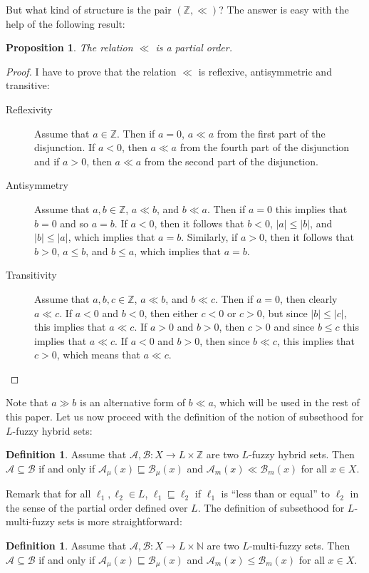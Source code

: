 \documentclass{amsart}
\newtheorem{proposition}[theorem]{Proposition}
\theoremstyle{definition}
\newtheorem{definition}[theorem]{Definition}
\begin{document}
But what kind of structure is
the pair $(\mathbb{Z},\ll)$? The answer is easy with the help of the following
result: 
\begin{proposition}
The relation $\ll$ is a partial order.
\end{proposition}
\begin{proof}
I have to prove that the relation $\ll$ is reflexive, antisymmetric and transitive:
\begin{description}
\item[Reflexivity] Assume that $a\in\mathbb{Z}$. Then if $a=0$, $a\ll a$ from the
first part of the disjunction. If $a<0$, then $a\ll a$ from the fourth part of the
disjunction and if $a>0$, then $a\ll a$ from the second part of the disjunction.
\item[Antisymmetry] Assume that $a,b\in\mathbb{Z}$, $a\ll b$, and $b\ll a$. Then
if $a=0$ this implies that $b=0$ and so $a=b$. If $a<0$, then it follows that $b<0$,
$|a|\le|b|$, and $|b|\le|a|$, which implies that $a=b$. Similarly, if $a>0$, then it
follows that $b>0$, $a\le b$, and $b\le a$, which implies that $a=b$.
\item[Transitivity] Assume that $a,b,c\in\mathbb{Z}$, $a\ll b$, and $b\ll c$.
Then if $a=0$, then clearly $a\ll c$. If $a<0$ and $b<0$, then either $c<0$ or $c>0$, but
since $|b|\le|c|$, this implies that $a\ll c$. If $a>0$ and $b>0$, then $c>0$ and since 
$b\le c$ this implies that $a\ll c$. If $a<0$ and $b>0$, then since $b\ll c$, this implies
that $c>0$, which means that $a\ll c$.
\end{description}
\end{proof} 
Note that $a\gg b$ is an alternative form of $b\ll a$, which will be used in the rest
of this paper. Let us now proceed with the definition of the notion of subsethood for 
$L$-fuzzy hybrid sets:
\begin{definition}
Assume that $\mathscr{A},\mathscr{B}:X\rightarrow L\times\mathbb{Z}$ are two $L$-fuzzy 
hybrid sets. Then $\mathscr{A}\subseteq\mathscr{B}$ if and only if 
$\mathscr{A}_{\mu}(x)\sqsubseteq\mathscr{B}_{\mu}(x)$ and
$\mathscr{A}_{m}(x)\ll\mathscr{B}_{m}(x)$ for all $x\in X$.
\end{definition} 
Remark that for all $\ell_1,\ell_2\in L$, $\ell_1\sqsubseteq\ell_2$ if $\ell_1$ is ``less 
than or equal'' to $\ell_2$ in the sense of the partial order defined over $L$. The
definition of subsethood for $L$-multi-fuzzy sets is more straightforward:
\begin{definition}
Assume that $\mathscr{A},\mathscr{B}:X\rightarrow L\times\mathbb{N}$ are two 
$L$-multi-fuzzy sets. Then $\mathscr{A}\subseteq\mathscr{B}$ if and only if 
$\mathscr{A}_{\mu}(x)\sqsubseteq\mathscr{B}_{\mu}(x)$ and
$\mathscr{A}_{m}(x)\le\mathscr{B}_{m}(x)$ for all $x\in X$.
\end{definition} 
\end{document}
